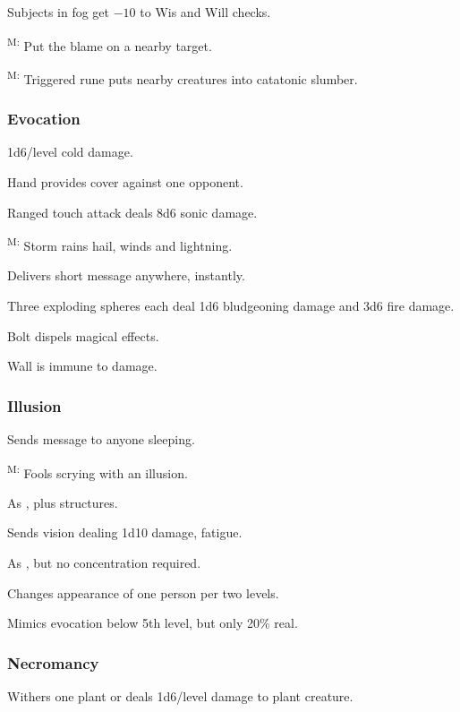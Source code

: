 	 Subjects in fog get $-10$ to Wis and Will checks.

	\textsuperscript{M:} Put the blame on a nearby target. %

	\textsuperscript{M:} Triggered rune puts nearby creatures into catatonic slumber.

\subsubsection{Evocation}
	
	 1d6/level cold damage.
	
	 Hand provides cover against one opponent.
	
	 Ranged touch attack deals 8d6 sonic damage. %
	
	\textsuperscript{M:} Storm rains hail, winds and lightning. %
	
	 Delivers short message anywhere, instantly.

	 Three exploding spheres each deal 1d6 bludgeoning damage and 3d6 fire damage. %
	
	 Bolt dispels magical effects. %
	
	 Wall is immune to damage.

\subsubsection{Illusion}
	 Sends message to anyone sleeping.

	\textsuperscript{M:} Fools scrying with an illusion.

	 As , plus structures.

	 Sends vision dealing 1d10 damage, fatigue.

	 As , but no concentration required.

	 Changes appearance of one person per two levels.

	 Mimics evocation below 5th level, but only 20\% real.

\subsubsection{Necromancy}
	 Withers one plant or deals 1d6/level damage to plant creature.

